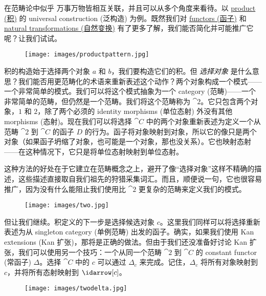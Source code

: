 
\lettrine[lhang=0.17]{在}{范畴论中似乎} 万事万物皆相互关联，并且可以从多个角度来看待。以 \hyperref[products-and-coproducts]{product (积)} 的 universal construction (泛构造) 为例。既然我们对 \hyperref[functors]{functors (函子)} 和 \hyperref[natural-transformations]{natural transformations (自然变换)} 有了更多了解，我们能否简化并可能推广它呢？让我们试试。

\begin{figure}[H]
  \centering
  \texttt{[image: images/productpattern.jpg]}
\end{figure}

\noindent
积的构造始于选择两个对象 $a$ 和 $b$，我们要构造它们的积。但 \emph{选择对象} 是什么意思？我们能否用更范畴化的术语来重新表述这个动作？两个对象构成一个模式——一个非常简单的模式。我们可以将这个模式抽象为一个 category (范畴)——一个非常简单的范畴，但仍然是一个范畴。我们将这个范畴称为 $\cat{2}$。它只包含两个对象，$1$ 和 $2$，除了两个必须的 identity morphisms (单位态射) 外没有其他 morphisms (态射)。现在我们可以将选择 $\cat{C}$ 中的两个对象重新表述为定义一个从范畴 $\cat{2}$ 到 $\cat{C}$ 的函子 $D$ 的行为。函子将对象映射到对象，所以它的像只是两个对象（如果函子坍缩了对象，也可能是一个对象，那也没关系）。它也映射态射——在这种情况下，它只是将单位态射映射到单位态射。

这种方法的好处在于它建立在范畴概念之上，避开了像“选择对象”这样不精确的描述，这些描述直接取自我们祖先的狩猎采集词汇。而且，顺便说一句，它也很容易推广，因为没有什么能阻止我们使用比 $\cat{2}$ 更复杂的范畴来定义我们的模式。

\begin{figure}[H]
  \centering
  \texttt{[image: images/two.jpg]}
\end{figure}

\noindent
但让我们继续。积定义的下一步是选择候选对象 $c$。这里我们同样可以将选择重新表述为从 singleton category (单例范畴) 出发的函子。确实，如果我们使用 Kan extensions (Kan 扩张)，那将是正确的做法。但由于我们还没准备好讨论 Kan 扩张，我们可以使用另一个技巧：一个从同一个范畴 $\cat{2}$ 到 $\cat{C}$ 的 constant functor (常函子) $\Delta$。选择 $\cat{C}$ 中的 $c$ 可以通过 $\Delta_c$ 来完成。记住，$\Delta_c$ 将所有对象映射到 $c$，并将所有态射映射到 $\idarrow[c]$。

\begin{figure}[H]
  \centering
  \texttt{[image: images/twodelta.jpg]}
\end{figure}

